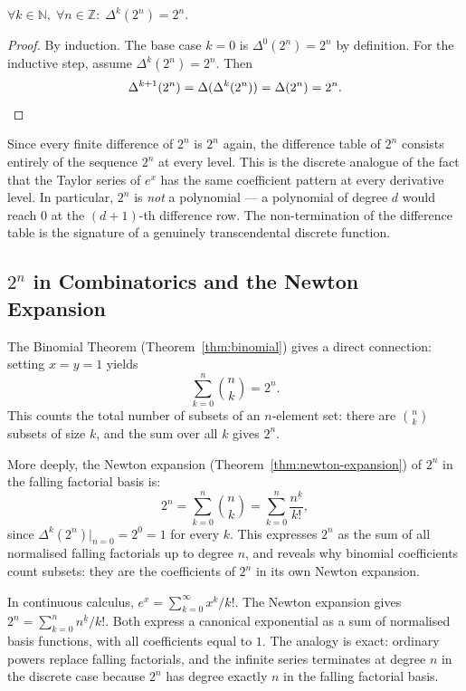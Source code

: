 \begin{remark*}
\(\forall k \in \mathbb{N},\; \forall n \in \mathbb{Z}:\; \Delta^k(2^n) = 2^n\).
\end{remark*}

\begin{proof}
By induction. The base case \(k = 0\) is \(\Delta^0(2^n) = 2^n\) by
definition. For the inductive step, assume \(\Delta^k(2^n) = 2^n\). Then
\[
\Delta^{k+1}(2^n) = \Delta(\Delta^k(2^n)) = \Delta(2^n) = 2^n. \qedhere
\]
\end{proof}

\begin{remark*}
Since every finite difference of \(2^n\) is \(2^n\) again, the difference
table of \(2^n\) consists entirely of the sequence \(2^n\) at every level.
This is the discrete analogue of the fact that the Taylor series of \(e^x\)
has the same coefficient pattern at every derivative level. In particular,
\(2^n\) is \emph{not} a polynomial --- a polynomial of degree \(d\) would
reach \(0\) at the \((d+1)\)-th difference row. The non-termination of
the difference table is the signature of a genuinely transcendental discrete
function.
\end{remark*}

\subsection*{\texorpdfstring{\(2^n\) in Combinatorics and the Newton Expansion}{2 to the n in Combinatorics and the Newton Expansion}}

The Binomial Theorem (Theorem~\ref{thm:binomial}) gives a direct connection:
setting \(x = y = 1\) yields
\[
\sum_{k=0}^{n} \binom{n}{k} = 2^n.
\]
This counts the total number of subsets of an \(n\)-element set: there are
\(\binom{n}{k}\) subsets of size \(k\), and the sum over all \(k\) gives
\(2^n\).

More deeply, the Newton expansion (Theorem~\ref{thm:newton-expansion}) of \(2^n\)
in the falling factorial basis is:
\[
2^n = \sum_{k=0}^{n} \binom{n}{k} = \sum_{k=0}^{n} \frac{n^{\underline{k}}}{k!},
\]
since \(\Delta^k(2^n)\big|_{n=0} = 2^0 = 1\) for every \(k\). This expresses
\(2^n\) as the sum of all normalised falling factorials up to degree \(n\),
and reveals why binomial coefficients count subsets: they are the coefficients
of \(2^n\) in its own Newton expansion.

\begin{remark*}
In continuous calculus, \(e^x = \sum_{k=0}^{\infty} x^k/k!\). The Newton
expansion gives \(2^n = \sum_{k=0}^{n} n^{\underline{k}}/k!\). Both express
a canonical exponential as a sum of normalised basis functions, with all
coefficients equal to \(1\). The analogy is exact: ordinary powers replace
falling factorials, and the infinite series terminates at degree \(n\) in
the discrete case because \(2^n\) has degree exactly \(n\) in the falling
factorial basis.
\end{remark*}

